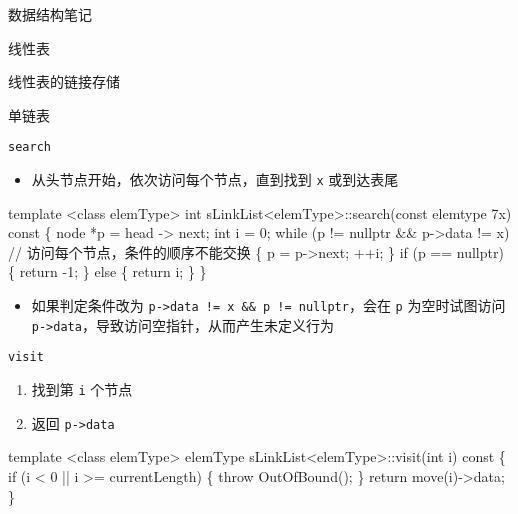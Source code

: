\documentclass[
  ignorenonframetext,
]{beamer}
\newenvironment{Shaded}{}{}
\newcommand{\NormalTok}[1]{#1}
\providecommand{\tightlist}{%
  \setlength{\itemsep}{0pt}\setlength{\parskip}{0pt}}
\begin{document}
\begin{frame}[fragile]{数据结构笔记}
\begin{block}{线性表}
\begin{block}{线性表的链接存储}
\begin{block}{单链表}
\begin{block}{\texttt{search}}
\protect{}\label{search-1}
\begin{itemize}
\tightlist
\item
  从头节点开始，依次访问每个节点，直到找到 \texttt{x} 或到达表尾
\end{itemize}

\begin{Shaded}
\begin{Highlighting}[]
\NormalTok{template \textless{}class elemType\textgreater{}}
\NormalTok{int sLinkList\textless{}elemType\textgreater{}::search(const elemtype 7x) const}
\NormalTok{\{}
\NormalTok{  node *p = head {-}\textgreater{} next;}
\NormalTok{  int i = 0;}
\NormalTok{  while (p != nullptr \&\& p{-}\textgreater{}data != x) // 访问每个节点，条件的顺序不能交换}
\NormalTok{  \{}
\NormalTok{    p = p{-}\textgreater{}next;}
\NormalTok{    ++i;}
\NormalTok{  \}}
\NormalTok{  if (p == nullptr)}
\NormalTok{  \{}
\NormalTok{    return {-}1;}
\NormalTok{  \}}
\NormalTok{  else}
\NormalTok{  \{}
\NormalTok{    return i;}
\NormalTok{  \}}
\NormalTok{\}}
\end{Highlighting}
\end{Shaded}

\begin{itemize}
\tightlist
\item
  如果判定条件改为
  \texttt{p-\textgreater{}data\ !=\ x\ \&\&\ p\ !=\ nullptr}，会在
  \texttt{p} 为空时试图访问
  \texttt{p-\textgreater{}data}，导致访问空指针，从而产生未定义行为
\end{itemize}
\end{block}

\begin{block}{\texttt{visit}}
\protect{}\label{visit}
\begin{enumerate}
\tightlist
\item
  找到第 \texttt{i} 个节点
\item
  返回 \texttt{p-\textgreater{}data}
\end{enumerate}

\begin{Shaded}
\begin{Highlighting}[]
\NormalTok{template \textless{}class elemType\textgreater{}}
\NormalTok{elemType sLinkList\textless{}elemType\textgreater{}::visit(int i) const}
\NormalTok{\{}
\NormalTok{  if (i \textless{} 0 || i \textgreater{}= currentLength)}
\NormalTok{  \{}
\NormalTok{    throw OutOfBound();}
\NormalTok{  \}}
\NormalTok{  return move(i){-}\textgreater{}data;}
\NormalTok{\}}
\end{Highlighting}
\end{Shaded}
\end{block}


\end{block}
\end{block}
\end{block}
\end{frame}
\end{document}

